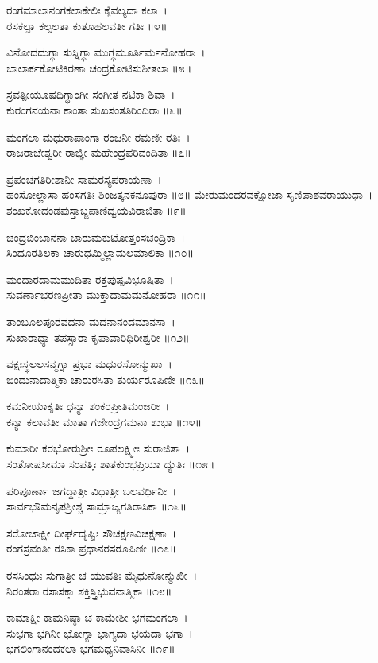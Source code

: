 ರಂಗಮಾಲಾನಂಗಕಲಾಕೇಲಿಃ ಕೈವಲ್ಯದಾ ಕಲಾ~।\\
ರಸಕಲ್ಪಾ ಕಲ್ಪಲತಾ ಕುತೂಹಲವತೀ ಗತಿಃ ॥೪॥

	ವಿನೋದದುಗ್ಧಾ ಸುಸ್ನಿಗ್ಧಾ ಮುಗ್ಧಮೂರ್ತಿರ್ಮನೋಹರಾ~।\\
	ಬಾಲಾರ್ಕಕೋಟಿಕಿರಣಾ ಚಂದ್ರಕೋಟಿಸುಶೀತಲಾ ॥೫॥

ಸ್ರವತ್ಪೀಯೂಷದಿಗ್ಧಾಂಗೀ ಸಂಗೀತ ನಟಿಕಾ ಶಿವಾ~।\\
ಕುರಂಗನಯನಾ ಕಾಂತಾ ಸುಖಸಂತತಿರಿಂದಿರಾ ॥೬॥

	ಮಂಗಲಾ ಮಧುರಾಪಾಂಗಾ ರಂಜನೀ ರಮಣೀ ರತಿಃ~।\\
	ರಾಜರಾಜೇಶ್ವರೀ ರಾಜ್ಞೀ ಮಹೇಂದ್ರಪರಿವಂದಿತಾ ॥೭॥

ಪ್ರಪಂಚಗತಿರೀಶಾನೀ ಸಾಮರಸ್ಯಪರಾಯಣಾ~।\\
ಹಂಸೋಲ್ಲಾಸಾ ಹಂಸಗತಿಃ ಶಿಂಜತ್ಕನಕನೂಪುರಾ ॥೮॥
\newpage
	ಮೇರುಮಂದರವಕ್ಷೋಜಾ ಸೃಣಿಪಾಶವರಾಯುಧಾ~।\\
	ಶಂಖಕೋದಂಡಪುಸ್ತಾಬ್ಜಪಾಣಿದ್ವಯವಿರಾಜಿತಾ ॥೯॥

ಚಂದ್ರಬಿಂಬಾನನಾ ಚಾರುಮಕುಟೋತ್ತಂಸಚಂದ್ರಿಕಾ~।\\
ಸಿಂದೂರತಿಲಕಾ ಚಾರುಧಮ್ಮಿಲ್ಲಾಮಲಮಾಲಿಕಾ ॥೧೦॥

	ಮಂದಾರದಾಮಮುದಿತಾ ರಕ್ತಪುಷ್ಪವಿಭೂಷಿತಾ~।\\
	ಸುವರ್ಣಾಭರಣಪ್ರೀತಾ ಮುಕ್ತಾದಾಮಮನೋಹರಾ ॥೧೧॥

ತಾಂಬೂಲಪೂರವದನಾ ಮದನಾನಂದಮಾನಸಾ~।\\
ಸುಖಾರಾಧ್ಯಾ ತಪಸ್ಸಾರಾ ಕೃಪಾವಾರಿಧಿರೀಶ್ವರೀ ॥೧೨॥

	ವಕ್ಷಃಸ್ಥಲಲಸನ್ಮಗ್ನಾ ಪ್ರಭಾ ಮಧುರಸೋನ್ಮುಖಾ~।\\
	ಬಿಂದುನಾದಾತ್ಮಿಕಾ ಚಾರುರಸಿತಾ ತುರ್ಯರೂಪಿಣೀ ॥೧೩॥

ಕಮನೀಯಾಕೃತಿಃ ಧನ್ಯಾ ಶಂಕರಪ್ರೀತಿಮಂಜರೀ~।\\
ಕನ್ಯಾ ಕಲಾವತೀ ಮಾತಾ ಗಜೇಂದ್ರಗಮನಾ ಶುಭಾ ॥೧೪॥

	ಕುಮಾರೀ ಕರಭೋರುಶ್ರೀಃ ರೂಪಲಕ್ಷ್ಮೀಃ ಸುರಾಜಿತಾ~।\\
	ಸಂತೋಷಸೀಮಾ ಸಂಪತ್ತಿಃ ಶಾತಕುಂಭಪ್ರಿಯಾ ದ್ಯುತಿಃ ॥೧೫॥

ಪರಿಪೂರ್ಣಾ ಜಗದ್ಧಾತ್ರೀ ವಿಧಾತ್ರೀ ಬಲವರ್ಧಿನೀ~।\\
ಸಾರ್ವಭೌಮನೃಪಶ್ರೀಶ್ಚ ಸಾಮ್ರಾಜ್ಯಗತಿರಾಸಿಕಾ ॥೧೬॥

	ಸರೋಜಾಕ್ಷೀ ದೀರ್ಘದೃಷ್ಟಿಃ ಸೌಚಕ್ಷಣವಿಚಕ್ಷಣಾ~।\\
	ರಂಗಸ್ರವಂತೀ ರಸಿಕಾ ಪ್ರಧಾನರಸರೂಪಿಣೀ ॥೧೭॥

ರಸಸಿಂಧುಃ ಸುಗಾತ್ರೀ ಚ ಯುವತಿಃ ಮೈಥುನೋನ್ಮುಖೀ~।\\
ನಿರಂತರಾ ರಸಾಸಕ್ತಾ ಶಕ್ತಿಸ್ತ್ರಿಭುವನಾತ್ಮಿಕಾ ॥೧೮॥

ಕಾಮಾಕ್ಷೀ ಕಾಮನಿಷ್ಠಾ ಚ ಕಾಮೇಶೀ ಭಗಮಂಗಲಾ~।\\
ಸುಭಗಾ ಭಗಿನೀ ಭೋಗ್ಯಾ ಭಾಗ್ಯದಾ ಭಯದಾ ಭಗಾ~।\\
ಭಗಲಿಂಗಾನಂದಕಲಾ ಭಗಮಧ್ಯನಿವಾಸಿನೀ ॥೧೯॥

